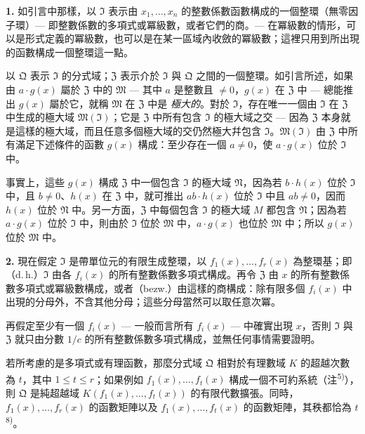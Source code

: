 \documentclass[11pt]{article}
\begin{document}
\noindent\textbf{1.}
如引言中那樣，以 $\mathfrak{I}$ 表示由 $x_1,\ldots,x_n$ 的整數係數函數構成的一個整環（無零因子環）--- 即整數係數的多項式或冪級數，或者它們的商。--- 在冪級數的情形，可以是形式定義的冪級數，也可以是在某一區域內收斂的冪級數；這裡只用到所出現的函數構成一個整環這一點。

以 $\mathfrak{Q}$ 表示 $\mathfrak{I}$ 的分式域；$\mathfrak{Z}$ 表示介於 $\mathfrak{I}$ 與 $\mathfrak{Q}$ 之間的一個整環。如引言所述，如果由 $a \cdot g(x)$ 屬於 $\mathfrak{Z}$ 中的 $\mathfrak{M}$ --- 其中 $a$ 是整數且 $\neq 0$，$g(x)$ 在 $\mathfrak{Z}$ 中 --- 總能推出 $g(x)$ 屬於它，就稱 $\mathfrak{M}$ 在 $\mathfrak{Z}$ 中是 \textit{極大的}。對於 $\mathfrak{I}$，存在唯一一個由 $\mathfrak{I}$ 在 $\mathfrak{Z}$ 中生成的極大域 $\mathfrak{M}(\mathfrak{I})$；它是 $\mathfrak{Z}$ 中所有包含 $\mathfrak{I}$ 的極大域之交 --- 因為 $\mathfrak{Z}$ 本身就是這樣的極大域，而且任意多個極大域的交仍然極大幷包含 $\mathfrak{I}$。$\mathfrak{M}(\mathfrak{I})$ 由 $\mathfrak{Z}$ 中所有滿足下述條件的函數 $g(x)$ 構成：至少存在一個 $a \neq 0$，使 $a \cdot g(x)$ 位於 $\mathfrak{I}$ 中。

事實上，這些 $g(x)$ 構成 $\mathfrak{Z}$ 中一個包含 $\mathfrak{I}$ 的極大域 $\mathfrak{N}$，因為若 $b \cdot h(x)$ 位於 $\mathfrak{I}$ 中，且 $b \neq 0$、$h(x)$ 在 $\mathfrak{Z}$ 中，就可推出 $ab \cdot h(x)$ 位於 $\mathfrak{I}$ 中且 $ab \neq 0$，因而 $h(x)$ 位於 $\mathfrak{N}$ 中。另一方面，$\mathfrak{Z}$ 中每個包含 $\mathfrak{I}$ 的極大域 $M$ 都包含 $\mathfrak{N}$；因為若 $a \cdot g(x)$ 位於 $\mathfrak{I}$ 中，則由於 $\mathfrak{I}$ 位於 $\mathfrak{M}$ 中，$a \cdot g(x)$ 也位於 $\mathfrak{M}$ 中；所以 $g(x)$ 位於 $\mathfrak{M}$ 中。

\medskip\noindent\textbf{2.}
現在假定 $\mathfrak{I}$ 是帶單位元的有限生成整環，以 $f_1(x),\ldots,f_r(x)$ 為整環基；即（d.\,h.）$\mathfrak{I}$ 由各 $f_i(x)$ 的所有整數係數多項式構成。再令 $\mathfrak{Z}$ 由 $x$ 的所有整數係數多項式或冪級數構成，或者（bezw.）由這樣的商構成：除有限多個 $f_i(x)$ 中出現的分母外，不含其他分母；這些分母當然可以取任意次冪。

再假定至少有一個 $f_i(x)$ --- 一般而言所有 $f_i(x)$ --- 中確實出現 $x$，否則 $\mathfrak{I}$ 與 $\mathfrak{Z}$ 就只由分數 $1/c$ 的所有整數係數多項式構成，並無任何事情需要證明。

若所考慮的是多項式或有理函數，那麼分式域 $\mathfrak{Q}$ 相對於有理數域 $K$ 的超越次數為 $t$，其中 $1 \leq t \leq r$；如果例如 $f_1(x),\ldots,f_t(x)$ 構成一個不可約系統（注\textsuperscript{5)}），則 $\mathfrak{Q}$ 是純超越域 $K(f_1(x),\ldots,f_t(x))$ 的有限代數擴張。同時，$f_1(x),\ldots,f_r(x)$ 的函數矩陣以及 $f_1(x),\ldots,f_t(x)$ 的函數矩陣，其秩都恰為 $t$\textsuperscript{8)}。
\end{document}
